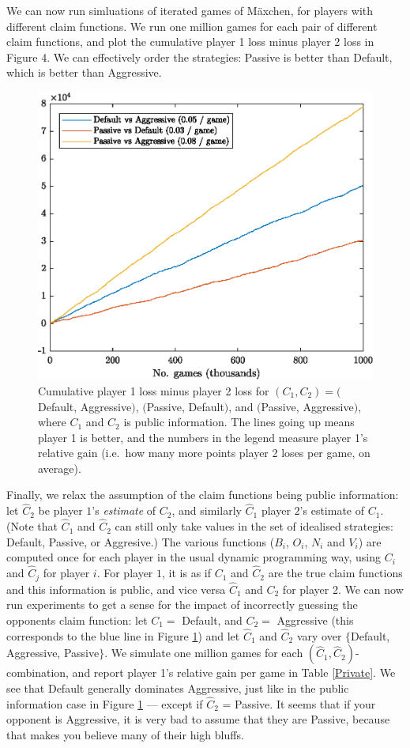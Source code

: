 \documentclass[12pt]{article}
\begin{document}
We can now run simluations of iterated games of M\"{a}xchen, for players with different claim functions. We run one million games for each pair of different claim functions, and plot the cumulative player 1 loss minus player 2 loss in Figure 4. We can effectively order the strategies: Passive is better than Default, which is better than Aggressive.

\begin{figure}
\center
  \includegraphics[width=0.5\linewidth]{Public.eps}
  \caption{Cumulative player 1 loss minus player 2 loss for $(C_1,C_2) = ($Default, Aggressive$)$, $($Passive, Default$)$, and $($Passive, Aggressive$)$, where $C_1$ and $C_2$ is public information. The lines going up means player 1 is better, and the numbers in the legend measure player 1's relative gain (i.e.\ how many more points player 2 loses per game, on average).}

  \label{Public}
\end{figure}

Finally, we relax the assumption of the claim functions being public information: let $\hat{C}_2$ be player $1$'s \emph{estimate} of $C_2$, and similarly $\hat{C}_1$ player $2$'s estimate of $C_1$. (Note that $\hat{C}_1$ and $\hat{C}_2$ can still only take values in the set of idealised strategies: Default, Passive, or Aggresive.) The various functions ($B_i$, $O_i$, $N_i$ and $V_i$) are computed once for each player in the usual dynamic programming way, using $C_i$ and $\hat{C}_j$ for player $i$. For player $1$, it is as if $C_1$ and $\hat{C}_2$ are the true claim functions and this information is public, and vice versa $\hat{C}_1$ and $C_2$ for player 2. We can now run experiments to get a sense for the impact of incorrectly guessing the opponents claim function: let $C_1 = $ Default, and $C_2 = $ Aggressive (this corresponds to the blue line in Figure \ref{Public}) and let $\hat{C}_1$ and $\hat{C}_2$ vary over $\{$Default, Aggressive, Passive$\}$. We simulate one million games for each $(\hat{C}_1,\hat{C}_2)$-combination, and report player 1's relative gain per game in Table \ref{Private}. We see that Default generally dominates Aggressive, just like in the public information case in Figure \ref{Public} --- except if $\hat{C}_2$ = Passive. It seems that if your opponent is Aggressive, it is very bad to assume that they are Passive, because that makes you believe many of their high bluffs.
\end{document}
